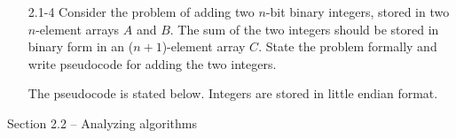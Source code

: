\documentclass{report}
\makeatletter
\renewenvironment{framed}{%
 \def\FrameCommand##1{\hskip\@totalleftmargin
 \fboxsep=\FrameSep\fbox{##1}}%
 \MakeFramed {\advance\hsize-\width
   \@totalleftmargin\z@ \linewidth\hsize
   \@setminipage}}%
 {\par\unskip\endMakeFramed}
\makeatother
\begin{document}
\begin{enumerate}
\item[2.1{-}4]{Consider the problem of adding two $n$-bit binary integers,
stored in two $n$-element arrays $A$ and $B$. The sum of the two integers should
be stored in binary form in an ($n + 1$)-element array $C$. State the problem
formally and write pseudocode for adding the two integers.}

\begin{framed}
The pseudocode is stated below. Integers are stored in little endian format.\\
\begin{algorithm}[H]
\SetAlgoNoEnd\DontPrintSemicolon
\BlankLine
{}
\end{algorithm}
\end{framed}

\end{enumerate}

\pagebreak

{\large Section 2.2 {--} Analyzing algorithms}
\end{document}
